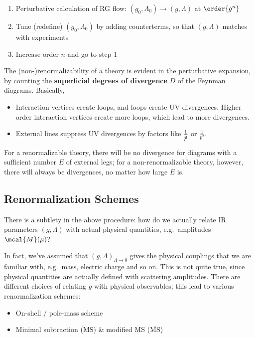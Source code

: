 \documentclass[a4paper
	,10pt
]{article}
\begin{document}
	\begin{enumerate}[noitemsep]
	\item
	  Perturbative calculation of RG flow:
	  $(g_0,\Lambda_0)\to (g,\Lambda)$ at $\order{g^n}$
	\item
	  Tune (redefine) $(g_0,\Lambda_0)$ by adding counterterms, so that
	  $(g,\Lambda)$ matches with experiments
	\item
	  Increase order $n$ and go to step 1
	\end{enumerate}
	
	The (non-)renormalizability of a theory is evident in the perturbative
	expansion, by counting the \textbf{superficial degrees of divergence}
	$D$ of the Feynman diagrams. Basically,
	
	\begin{itemize}
	\item
	  Interaction vertices create loops, and loops create UV divergences.
	  Higher order interaction vertices create more loops, which lead to
	  more divergences.
	\item
	  External lines suppress UV divergences by factors like
	  $\frac{1}{\cancel{p}}$ or $\frac{1}{p^2}$.
	\end{itemize}
	
	For a renormalizable theory, there will be no divergence for diagrams
	with a sufficient number $E$ of external legs; for a
	non-renormalizable theory, however, there will always be divergences, no
	matter how large $E$ is.
	
\subsection{Renormalization Schemes}
	
	There is a subtlety in the above procedure: how do we actually relate IR
	parameters $(g,\Lambda)$ with actual physical quantities,
	e.g.~amplitudes $\mcal{M}(\mu)$?
	
	In fact, we've assumed that $(g,\Lambda)_{\Lambda\to 0}$ gives the
	physical couplings that we are familiar with, e.g.~mass, electric charge
	and so on. This is not quite true, since physical quantities are
	actually defined with scattering amplitudes. There are different choices
	of relating $g$ with physical observables; this lead to various
	renormalization schemes:
	
	\begin{itemize}[nosep]
	
	\item
	  On-shell / pole-mass scheme
	\item
	  Minimal subtraction ($\mathrm{MS}$) \& modified MS
	  ($\overline{\mathrm{MS}}$)
	\end{itemize}
	
\end{document}
